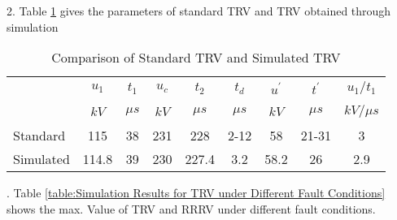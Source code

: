 2. Table \ref{table:Comparison of Standard TRV and Simulated TRV} gives the parameters of standard TRV and TRV obtained through simulation

\centering
\begin{table}[!htbp]
\begin{center}
\begin{threeparttable}
\caption{Comparison of Standard TRV and Simulated TRV}
\label{table:Comparison of Standard TRV and Simulated TRV}
\begin{tabular}{| l | c | c | c | c | c | c | c | c |}
\hline
{~}	&\textbf{$u_1$}&\textbf{$t_1$}&\textbf{$u_c$}&\textbf{$t_2$}&\textbf{$t_d$}&\textbf{$u^\prime$}&\textbf{$t^\prime$}&\textbf{$u_1/t_1$}\\

{~}&\textbf{$kV$}&\textbf{$\mu s$}&\textbf{$kV$}&\textbf{$\mu s$}&\textbf{$\mu s$}&\textbf{$kV$}&\textbf{$\mu s$}&\textbf{$kV/\mu s$}\\ \hline
Standard&115&38&231&228&2-12&58&21-31&3\\ \hline
Simulated&114.8&39&230&227.4&3.2&58.2&26&2.9\\ \hline
\end{tabular}
\end{threeparttable}
\end{center}
\end{table}

.	Table \ref{table:Simulation Results for TRV under Different Fault Conditions} shows the max. Value of TRV and RRRV under different fault conditions.

